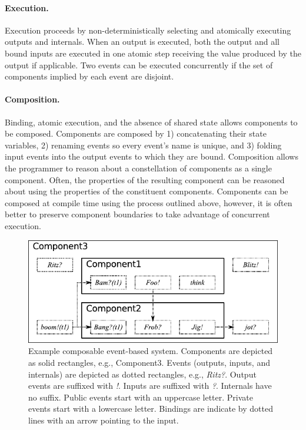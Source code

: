 \paragraph{Execution.}
Execution proceeds by non-deterministically selecting and atomically executing outputs and internals.
When an output is executed, both the output and all bound inputs are executed in one atomic step receiving the value produced by the output if applicable.
Two events can be executed concurrently if the set of components implied by each event are disjoint.

\paragraph{Composition.}
Binding, atomic execution, and the absence of shared state allows components to be composed.
Components are composed by 1) concatenating their state variables, 2) renaming events so every event's name is unique, and 3) folding input events into the output events to which they are bound.
Composition allows the programmer to reason about a constellation of components as a single component.
Often, the properties of the resulting component can be reasoned about using the properties of the constituent components.
Components can be composed at compile time using the process outlined above, however, it is often better to preserve component boundaries to take advantage of concurrent execution.

\begin{figure}
\center
\includegraphics{system_model}
\caption{Example composable event-based system.
  Components are depicted as solid rectangles, e.g., Component3.
  Events (outputs, inputs, and internals) are depicted as dotted rectangles, e.g., \emph{Ritz?}.
  Output events are suffixed with \emph{!}.
  Inputs are suffixed with \emph{?}.
  Internals have no suffix.
  Public events start with an uppercase letter.
  Private events start with a lowercase letter.
  Bindings are indicate by dotted lines with an arrow pointing to the input.}
\label{sys_model}
\end{figure}

